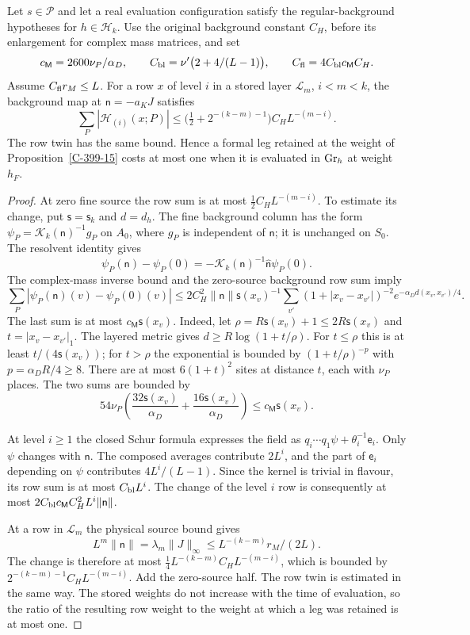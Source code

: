 \documentclass[11pt,letterpaper,reqno]{amsart}
\makeatletter
\theoremstyle{definition}
\newcommand{\ms@minorstart}{%
  \pushQED{\qed}\renewcommand{\qedsymbol}{$\blacksquare$}}
\newenvironment{lemma}[1][]{\ms@minorstart\ms@lemma[#1]}
  {\popQED\endms@lemma}
\theoremstyle{remark}
\makeatother
\begin{document}
\begin{lemma}[The remaining weight of stored formal legs]\label{C-407-41}
Let $s\in\mathcal P$ and let a real evaluation configuration
satisfy the regular-background hypotheses for $h\in\mathcal H_k$.
Use the original background constant $C_H$, before its enlargement
for complex mass matrices, and set
\[
 c_{\mathsf M}=2600\nu_P/\alpha_D,\qquad
 C_{\rm bl}=\nu'\bigl(2+4/(L-1)\bigr),\qquad
 C_{\rm fl}=4C_{\rm bl}c_{\mathsf M}C_H.
\]
Assume $C_{\rm fl}r_M\le L$. For a row $x$ of level $i$ in a
stored layer $\mathcal L_m$, $i<m<k$, the background map at
$\mathsf n=-a_KJ$ satisfies
\[
 \sum_P|\mathcal H_{(i)}(x;P)|
 \le\bigl(\tfrac12+2^{-(k-m)-1}\bigr)C_HL^{-(m-i)}.
\]
The row twin has the same bound. Hence a formal leg retained at
the weight of Proposition~\ref{C-399-15} costs at most one when
it is evaluated in ${\rm Gr}_h$ at weight $h_F$.
\end{lemma}
\begin{proof}
At zero fine source the row sum is at most
$\tfrac12 C_HL^{-(m-i)}$. To estimate its change, put
$\mathsf s=\mathsf s_k$ and $d=d_h$. The fine background
column has the form $\psi_P=\mathcal K_k(\mathsf n)^{-1}g_P$
on $A_0$, where $g_P$ is independent of $\mathsf n$; it is
unchanged on $S_0$. The resolvent identity gives
\[
 \psi_P(\mathsf n)-\psi_P(0)
   =-\mathcal K_k(\mathsf n)^{-1}\hat{\mathsf n}\psi_P(0).
\]
The complex-mass inverse bound and the zero-source background
row sum imply
\[
 \sum_P|\psi_P(\mathsf n)(v)-\psi_P(0)(v)|
 \le2C_H^2\|\mathsf n\|\mathsf s(x_v)^{-1}
 \sum_{v'}(1+|x_v-x_{v'}|)^{-2}e^{-\alpha_Dd(x_v,x_{v'})/4}.
\]
The last sum is at most $c_{\mathsf M}\mathsf s(x_v)$.
Indeed, let $\rho=R\mathsf s(x_v)+1\le2R\mathsf s(x_v)$
and $t=|x_v-x_{v'}|_1$. The layered metric gives
$d\ge R\log(1+t/\rho)$. For $t\le\rho$ this is at least
$t/(4\mathsf s(x_v))$; for $t>\rho$ the exponential is
bounded by $(1+t/\rho)^{-p}$ with $p=\alpha_DR/4\ge8$.
There are at most $6(1+t)^2$ sites at distance $t$, each with
$\nu_P$ places. The two sums are bounded by
\[
 54\nu_P\left(\frac{32\mathsf s(x_v)}{\alpha_D}
              +\frac{16\mathsf s(x_v)}{\alpha_D}\right)
 \le c_{\mathsf M}\mathsf s(x_v).
\]

At level $i\ge1$ the closed Schur formula expresses the field
as $q_i\cdots q_1\psi+\theta_i^{-1}\mathsf e_i$. Only $\psi$
changes with $\mathsf n$. The composed averages contribute
$2L^i$, and the part of $\mathsf e_i$ depending on $\psi$
contributes $4L^i/(L-1)$. Since the kernel is trivial in flavour,
its row sum is at most $C_{\rm bl}L^i$. The change of the level
$i$ row is consequently at most
$2C_{\rm bl}c_{\mathsf M}C_H^2L^i\|\mathsf n\|$.

At a row in $\mathcal L_m$ the physical source bound gives
\[
 L^m\|\mathsf n\|=\lambda_m\|J\|_\infty
 \le L^{-(k-m)}r_M/(2L).
\]
The change is therefore at most
$\tfrac14L^{-(k-m)}C_HL^{-(m-i)}$, which is bounded by
$2^{-(k-m)-1}C_HL^{-(m-i)}$. Add the zero-source half.
The row twin is estimated in the same way. The stored weights
do not increase with the time of evaluation, so the ratio of
the resulting row weight to the weight at which a leg was
retained is at most one.
\end{proof}
\end{document}
